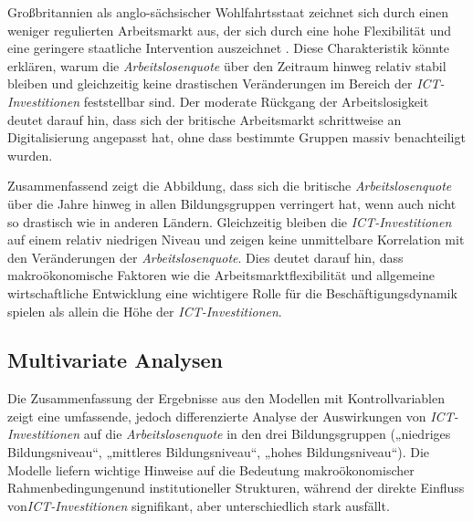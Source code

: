 Großbritannien als anglo-sächsischer Wohlfahrtsstaat zeichnet sich durch einen 
weniger regulierten Arbeitsmarkt aus, der sich durch eine hohe Flexibilität und eine 
geringere staatliche Intervention auszeichnet 
\parencite[vgl.][S. 21]{trabert1997entwicklung}. 
Diese Charakteristik könnte erklären, warum die \textit{Arbeitslosenquote} über den 
Zeitraum hinweg relativ stabil bleiben und gleichzeitig keine drastischen Veränderungen 
im Bereich der \textit{\ac{ICT}-Investitionen} feststellbar sind. Der moderate Rückgang 
der Arbeitslosigkeit deutet darauf hin, dass sich der britische Arbeitsmarkt schrittweise 
an Digitalisierung angepasst hat, ohne dass bestimmte Gruppen massiv benachteiligt wurden.

Zusammenfassend zeigt die Abbildung, dass sich die britische \textit{Arbeitslosenquote} 
über die Jahre hinweg in allen Bildungsgruppen verringert hat, wenn auch nicht so drastisch 
wie in anderen Ländern. Gleichzeitig bleiben die \textit{\ac{ICT}-Investitionen} auf einem 
relativ niedrigen Niveau und zeigen keine unmittelbare Korrelation mit den Veränderungen 
der \textit{Arbeitslosenquote}. Dies deutet darauf hin, dass makroökonomische Faktoren wie 
die Arbeitsmarktflexibilität und allgemeine wirtschaftliche Entwicklung eine wichtigere 
Rolle für die Beschäftigungsdynamik spielen als allein die Höhe der 
\textit{\ac{ICT}-Investitionen}.



\subsection{Multivariate Analysen}

Die Zusammenfassung der Ergebnisse aus den Modellen mit Kontrollvariablen zeigt eine 
umfassende, jedoch differenzierte Analyse der Auswirkungen von 
\textit{\ac{ICT}-Investitionen} auf die \textit{Arbeitslosenquote} in den drei 
Bildungsgruppen („niedriges Bildungsniveau“, „mittleres Bildungsniveau“, „hohes 
Bildungsniveau“). Die Modelle liefern wichtige Hinweise auf die Bedeutung 
makroökonomischer Rahmenbedingungenund institutioneller Strukturen, während der direkte 
Einfluss von\textit{\ac{ICT}-Investitionen} signifikant, aber unterschiedlich stark 
ausfällt.



